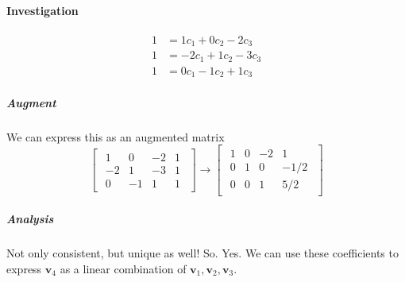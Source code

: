 \documentclass{article}
\begin{document}
        \paragraph{Investigation}
            \begin{align*}
                1 &= 1c_1 + 0c_2 -2c_3\\
                1 &= -2c_1 + 1c_2 -3c_3\\
                1 &= 0c_1 -1c_2 + 1c_3 
            \end{align*}
            \subparagraph{Augment}
                We can express this as an augmented matrix
                \[
                \begin{bmatrix}
                \begin{array}{ccc|c}
                    1 &  0 &  -2 & 1 \\
                    -2 &  1 &  -3 & 1 \\
                    0 & -1 &   1 & 1
                \end{array}
                \end{bmatrix}
                \rightarrow
                \begin{bmatrix}
                \begin{array}{ccc|c}
                    1 &  0 &  -2 & 1 \\
                    0 &  1 &  0 & -1/2 \\
                    0 &  0 &  1 & 5/2
                \end{array}
                \end{bmatrix}
                \]
            \subparagraph{Analysis}
                Not only consistent, but unique as well!
                So. Yes. We can use these coefficients
                to express $\mathbf{v}_4$ as a linear combination
                of $\mathbf{v}_1, \mathbf{v}_2, \mathbf{v}_3$.
\end{document}
